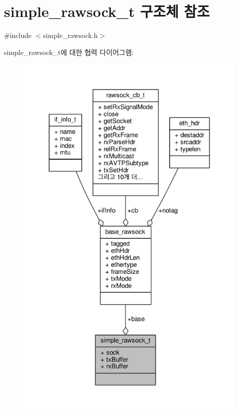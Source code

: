 \hypertarget{structsimple__rawsock__t}{}\section{simple\+\_\+rawsock\+\_\+t 구조체 참조}
\label{structsimple__rawsock__t}


{\ttfamily \#include $<$simple\+\_\+rawsock.\+h$>$}



simple\+\_\+rawsock\+\_\+t에 대한 협력 다이어그램\+:
\nopagebreak
\begin{figure}[H]
\begin{center}
\leavevmode
\includegraphics[width=333pt]{structsimple__rawsock__t__coll__graph}
\end{center}
\end{figure}
